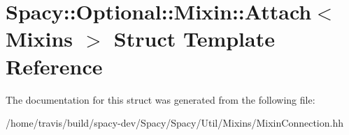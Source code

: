 \hypertarget{structSpacy_1_1Optional_1_1Mixin_1_1Attach}{\section{Spacy\-:\-:Optional\-:\-:Mixin\-:\-:Attach$<$ Mixins $>$ Struct Template Reference}
\label{structSpacy_1_1Optional_1_1Mixin_1_1Attach}
}


The documentation for this struct was generated from the following file\-:\begin{DoxyCompactItemize}
\item 
/home/travis/build/spacy-\/dev/\-Spacy/\-Spacy/\-Util/\-Mixins/Mixin\-Connection.\-hh\end{DoxyCompactItemize}
